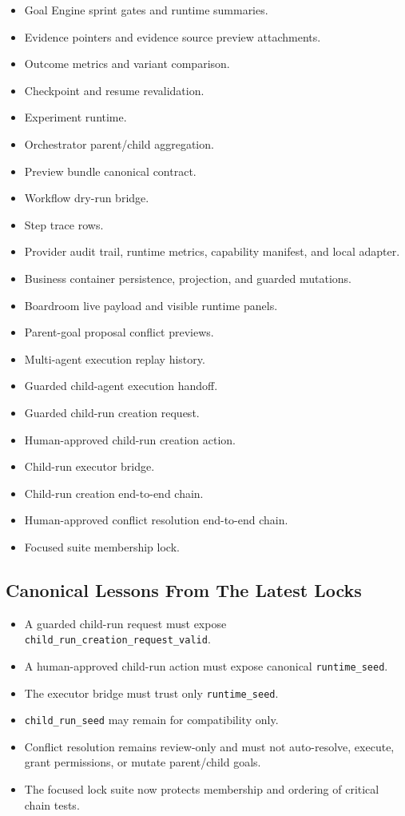 \begin{itemize}
  \item Goal Engine sprint gates and runtime summaries.
  \item Evidence pointers and evidence source preview attachments.
  \item Outcome metrics and variant comparison.
  \item Checkpoint and resume revalidation.
  \item Experiment runtime.
  \item Orchestrator parent/child aggregation.
  \item Preview bundle canonical contract.
  \item Workflow dry-run bridge.
  \item Step trace rows.
  \item Provider audit trail, runtime metrics, capability manifest, and local adapter.
  \item Business container persistence, projection, and guarded mutations.
  \item Boardroom live payload and visible runtime panels.
  \item Parent-goal proposal conflict previews.
  \item Multi-agent execution replay history.
  \item Guarded child-agent execution handoff.
  \item Guarded child-run creation request.
  \item Human-approved child-run creation action.
  \item Child-run executor bridge.
  \item Child-run creation end-to-end chain.
  \item Human-approved conflict resolution end-to-end chain.
  \item Focused suite membership lock.
\end{itemize}

\subsection{Canonical Lessons From The Latest Locks}

\begin{itemize}
  \item A guarded child-run request must expose \texttt{child\_run\_creation\_request\_valid}.
  \item A human-approved child-run action must expose canonical \texttt{runtime\_seed}.
  \item The executor bridge must trust only \texttt{runtime\_seed}.
  \item \texttt{child\_run\_seed} may remain for compatibility only.
  \item Conflict resolution remains review-only and must not auto-resolve, execute, grant permissions, or mutate parent/child goals.
  \item The focused lock suite now protects membership and ordering of critical chain tests.
\end{itemize}


